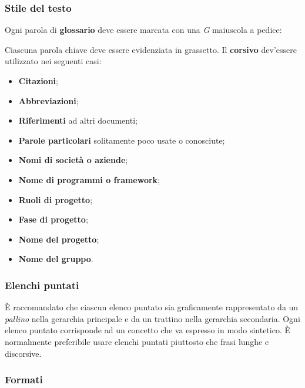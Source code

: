 	\subsubsection{Stile del testo}
	
	Ogni parola di \textbf{glossario} deve essere marcata con una \textit{G} maiuscola a pedice:
	\begin{center}
	\end{center}

	Ciascuna parola chiave deve essere evidenziata in grassetto. Il \textbf{corsivo} dev'essere utilizzato nei seguenti casi:
	\begin{itemize}
	
		\item \textbf{Citazioni};
		\item \textbf{Abbreviazioni};
		\item \textbf{Riferimenti} ad altri documenti;
		\item \textbf{Parole particolari} solitamente poco usate o conosciute;
		\item \textbf{Nomi di società o aziende};
		\item \textbf{Nome di programmi o framework};
		\item \textbf{Ruoli di progetto};
		\item \textbf{Fase di progetto};
		\item \textbf{Nome del progetto};
		\item \textbf{Nome del gruppo}.
	\end{itemize}		
	
	\subsubsection{Elenchi puntati}
	
	È raccomandato che ciascun elenco puntato sia graficamente rappresentato da un \textit{pallino} nella gerarchia principale e da un trattino nella gerarchia secondaria. Ogni elenco puntato corrisponde ad un concetto che va espresso in modo sintetico. È normalmente preferibile usare elenchi puntati piuttosto che frasi lunghe e discorsive.
	
	\subsubsection{Formati}
	
